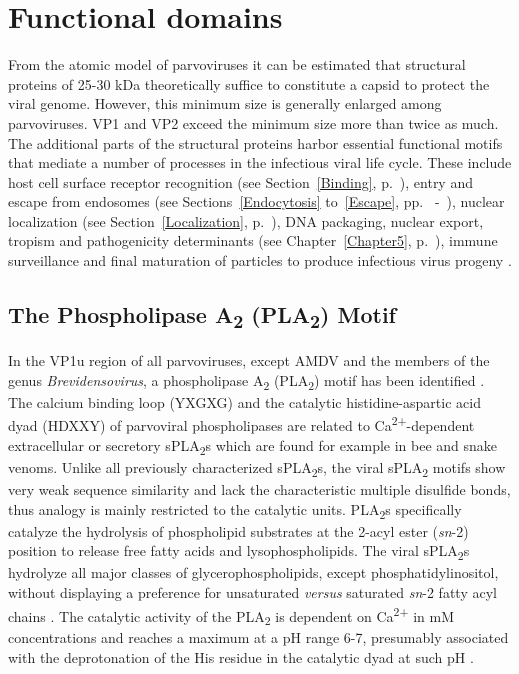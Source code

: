 \section{Functional domains}
\label{Motif}

From the atomic model of parvoviruses it can be estimated that structural proteins of 25-30 kDa theoretically suffice to constitute a capsid to protect the viral genome. However, this minimum size is generally enlarged among parvoviruses. VP1 and VP2 exceed the minimum size more than twice as much. The additional parts of the structural proteins harbor essential functional motifs that mediate a number of processes in the infectious viral life cycle. These include host cell surface receptor recognition (see Section~\ref{Binding}, p.~\pageref{Binding}), entry and escape from endosomes (see Sections~\ref{Endocytosis} to~\ref{Escape}, pp.~\pageref{Endocytosis} -~\pageref{Escape}), nuclear localization (see Section~\ref{Localization}, p.~\pageref{Localization}), DNA packaging, nuclear export, tropism and pathogenicity determinants (see Chapter~\ref{Chapter5}, p.~\pageref{Chapter5}), immune surveillance and final maturation of particles to produce infectious virus progeny \cite{PLA2}.    

\subsection{The Phospholipase A\textsubscript{2} (PLA\textsubscript{2}) Motif}
\label{PLA2}

In the VP1u region of all parvoviruses, except AMDV and the members of the genus \textit{Brevidensovirus}, a phospholipase A\textsubscript{2} (PLA\textsubscript{2}) motif has been identified \cite{pmid11702787}. The calcium binding loop (YXGXG) and the catalytic histidine-aspartic acid dyad (HDXXY) of parvoviral phospholipases are related to Ca\textsuperscript{2+}-dependent extracellular or secretory sPLA\textsubscript{2}s which are found for example in bee and snake venoms. Unlike all previously characterized sPLA\textsubscript{2}s, the viral sPLA\textsubscript{2} motifs show very weak sequence similarity and lack the characteristic multiple disulfide bonds, thus analogy is mainly restricted to the catalytic units. PLA\textsubscript{2}s specifically catalyze the hydrolysis of phospholipid substrates at the 2-acyl ester (\textit{sn}-2) position to release free fatty acids and lysophospholipids. The viral sPLA\textsubscript{2}s hydrolyze all major classes of glycerophospholipids, except phosphatidylinositol, without displaying a preference for unsaturated \textit{versus} saturated \textit{sn}-2 fatty acyl chains \cite{pmid14726513}. The catalytic activity of the PLA\textsubscript{2} is dependent on Ca\textsuperscript{2+} in mM concentrations and reaches a maximum at a pH range 6-7, presumably associated with the deprotonation of the His residue in the catalytic dyad at such pH \cite{pmid9115999, pmid7574497}.

